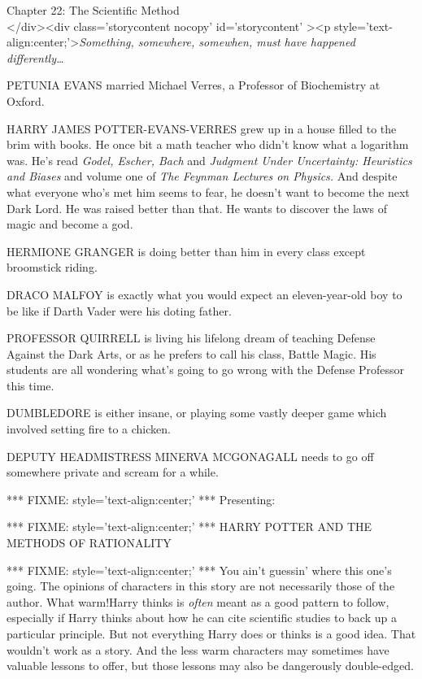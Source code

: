
Chapter 22: The Scientific Method\\
</div><div  class='storycontent nocopy' id='storycontent' ><p 
style='text-align:center;'>\emph{Something, somewhere, somewhen, must have 
happened differently{\ldots}}

PETUNIA EVANS married Michael Verres, a Professor of Biochemistry at Oxford.

HARRY JAMES POTTER-EVANS-VERRES grew up in a house filled to the brim with 
books. He once bit a math teacher who didn't know what a logarithm was. He's 
read \emph{Godel, Escher, Bach} and \emph{Judgment Under Uncertainty: 
Heuristics and Biases} and volume one of \emph{The Feynman Lectures on 
Physics.} And despite what everyone who's met him seems to fear, he doesn't 
want to become the next Dark Lord. He was raised better than that. He wants to 
discover the laws of magic and become a god.

HERMIONE GRANGER is doing better than him in every class except broomstick 
riding.

DRACO MALFOY is exactly what you would expect an eleven-year-old boy to be like 
if Darth Vader were his doting father.

PROFESSOR QUIRRELL is living his lifelong dream of teaching Defense Against the 
Dark Arts, or as he prefers to call his class, Battle Magic. His students are 
all wondering what's going to go wrong with the Defense Professor this time.

DUMBLEDORE is either insane, or playing some vastly deeper game which involved 
setting fire to a chicken.

DEPUTY HEADMISTRESS MINERVA MCGONAGALL needs to go off somewhere private and 
scream for a while.

*** FIXME: style='text-align:center;' ***
Presenting:

*** FIXME: style='text-align:center;' ***
HARRY POTTER AND THE METHODS OF RATIONALITY

*** FIXME: style='text-align:center;' ***
You ain't guessin' where this one's going.
\sbreak
The opinions of characters in this story are not necessarily those of the 
author. What warm!Harry thinks is \emph{often} meant as a good pattern to 
follow, especially if Harry thinks about how he can cite scientific studies to 
back up a particular principle. But not everything Harry does or thinks is a 
good idea. That wouldn't work as a story. And the less warm characters may 
sometimes have valuable lessons to offer, but those lessons may also be 
dangerously double-edged.

